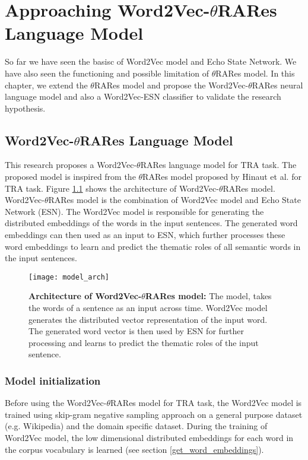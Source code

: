 \chapter{Approaching Word2Vec-$\theta$RARes Language Model} \label{approach}

So far we have seen the basisc of Word2Vec model and Echo State Network. We have also seen the functioning and possible limitation of $\theta$RARes model. In this chapter, we extend the $\theta$RARes model and propose the Word2Vec-$\theta$RARes neural language model and also a Word2Vec-ESN classifier to validate the research hypothesis.

\section{Word2Vec-$\theta$RARes Language Model} \label{sec:w2v-esn_model}

This research proposes a Word2Vec-$\theta$RARes language model for TRA task. The proposed model is inspired from the $\theta$RARes model proposed by Hinaut et al. \cite{xavier:2013:RT} for TRA task. Figure \ref{fig:model_arch} shows the architecture of Word2Vec-$\theta$RARes model. Word2Vec-$\theta$RARes model is the combination of Word2Vec model and Echo State Network (ESN). The Word2Vec model is responsible for generating the distributed embeddings of the words in the input sentences. The generated word embeddings can then used as an input to ESN, which further processes these word embeddings to learn and predict the thematic roles of all semantic words in the input sentences.

\begin{figure}[hbtp]
\centering
\texttt{[image: model\_arch]}
\caption[Architecture of Word2Vec-$\theta$RARes model]{\textbf{Architecture of Word2Vec-$\theta$RARes model:} { \small The model, takes the words of a sentence as an input across time. Word2Vec model generates the distributed vector representation of the input word. The generated word vector is then used by ESN for further processing and learns to predict the thematic roles of the input sentence.}}
\label{fig:model_arch}
\end{figure}

\subsection{Model initialization}

Before using the Word2Vec-$\theta$RARes model for TRA task, the Word2Vec model is trained using skip-gram negative sampling \cite{w2v:mikolov_2013_distributed} approach on a general purpose dataset (e.g. Wikipedia) and the domain specific dataset. During the training of Word2Vec model, the low dimensional distributed embeddings for each word in the corpus vocabulary is learned (see section \ref{get_word_embeddings}).

